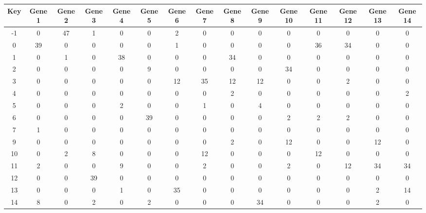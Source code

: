 \begin{tabular}{|c|c|c|c|c|c|c|c|c|c|c|c|c|c|c|}
\hline
Key & Gene 1 & Gene 2 & Gene 3 & Gene 4 & Gene 5 & Gene 6 & Gene 7 & Gene 8 & Gene 9 & Gene 10 & Gene 11 & Gene 12 & Gene 13 & Gene 14 \\
\hline
-1 & 0 & 47 & 1 & 0 & 0 & 2 & 0 & 0 & 0 & 0 & 0 & 0 & 0 & 0 \\
0 & 39 & 0 & 0 & 0 & 0 & 1 & 0 & 0 & 0 & 0 & 36 & 34 & 0 & 0 \\
1 & 0 & 1 & 0 & 38 & 0 & 0 & 0 & 34 & 0 & 0 & 0 & 0 & 0 & 0 \\
2 & 0 & 0 & 0 & 0 & 9 & 0 & 0 & 0 & 0 & 34 & 0 & 0 & 0 & 0 \\
3 & 0 & 0 & 0 & 0 & 0 & 12 & 35 & 12 & 12 & 0 & 0 & 2 & 0 & 0 \\
4 & 0 & 0 & 0 & 0 & 0 & 0 & 0 & 2 & 0 & 0 & 0 & 0 & 0 & 2 \\
5 & 0 & 0 & 0 & 2 & 0 & 0 & 1 & 0 & 4 & 0 & 0 & 0 & 0 & 0 \\
6 & 0 & 0 & 0 & 0 & 39 & 0 & 0 & 0 & 0 & 2 & 2 & 2 & 0 & 0 \\
7 & 1 & 0 & 0 & 0 & 0 & 0 & 0 & 0 & 0 & 0 & 0 & 0 & 0 & 0 \\
9 & 0 & 0 & 0 & 0 & 0 & 0 & 0 & 2 & 0 & 12 & 0 & 0 & 12 & 0 \\
10 & 0 & 2 & 8 & 0 & 0 & 0 & 12 & 0 & 0 & 0 & 12 & 0 & 0 & 0 \\
11 & 2 & 0 & 0 & 9 & 0 & 0 & 2 & 0 & 0 & 2 & 0 & 12 & 34 & 34 \\
12 & 0 & 0 & 39 & 0 & 0 & 0 & 0 & 0 & 0 & 0 & 0 & 0 & 0 & 0 \\
13 & 0 & 0 & 0 & 1 & 0 & 35 & 0 & 0 & 0 & 0 & 0 & 0 & 2 & 14 \\
14 & 8 & 0 & 2 & 0 & 2 & 0 & 0 & 0 & 34 & 0 & 0 & 0 & 2 & 0 \\
\hline
\end{tabular}